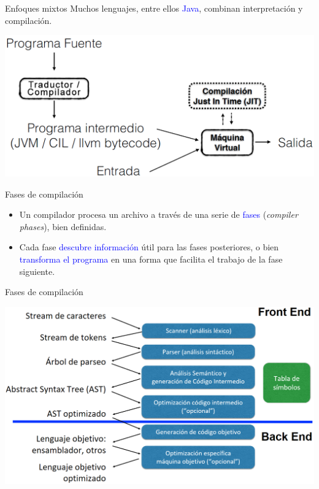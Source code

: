 \documentclass{beamer} %
\newcommand{\blue}[1]{\textcolor{blue}{#1}}
\begin{document}
\begin{frame}{Enfoques mixtos}
    Muchos lenguajes, entre ellos \blue{Java}, combinan interpretación y compilación.
    \begin{center}
      \includegraphics[width=.9\textwidth]{./image/cap1/enfoque-mixto}
    \end{center}
\end{frame}

\begin{frame}{Fases de compilación}
    \begin{itemize}
        \item Un compilador procesa un archivo a través de una serie de \blue{fases} (\textit{compiler phases}), bien definidas.
        \item Cada fase \blue{descubre información} útil para las fases posteriores, o bien \blue{transforma el programa} en una forma que facilita el trabajo de la fase siguiente.
    \end{itemize}
\end{frame}

\begin{frame}{Fases de compilación}
    \begin{center}
      \includegraphics[width=\textwidth]{./image/cap1/compilador-fases}
    \end{center}
\end{frame}
\end{document}
